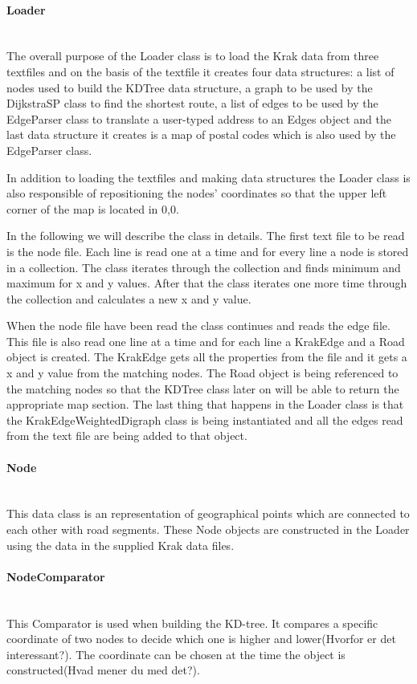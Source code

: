 \documentclass[a4paper,10pt,titlepage]{article}
\begin{document}
				
				\paragraph{Loader}\mbox{}\\
The overall purpose of the Loader class is to load the Krak data from three textfiles and on the basis of the textfile it creates four data structures: a list of nodes used to build the KDTree data structure, a graph to be used by the DijkstraSP class to find the shortest route, a list of edges to be used by the EdgeParser class to translate a user-typed address to an Edges object and the last data structure it creates is a map of postal codes which is also used by the EdgeParser class.

In addition to loading the textfiles and making data structures the Loader class is also responsible of repositioning the nodes' coordinates so that the upper left corner of the map is located in 0,0.

In the following we will describe the class in details. The first text file to be read is the node file. Each line is read one at a time and for every line a node is stored in a collection. The class iterates through the collection and finds minimum and maximum for x and y values. After that the class iterates one more time through the collection and calculates a new x and y value.  

When the node file have been read the class continues and reads the edge file. This file is also read one line at a time and for each line a KrakEdge and a Road object is created. The KrakEdge gets all the properties from the file and it gets a x and y value from the matching nodes. The Road object is being referenced to the matching nodes so that the KDTree class later on will be able to return the appropriate map section. The last thing that happens in the Loader class is that the KrakEdgeWeightedDigraph class is being instantiated and all the edges read from the text file are being added to that object. 

				\paragraph{Node}\mbox{}\\				
				This data class is an representation of geographical points which are connected to each other with road segments. These Node objects are constructed in the Loader using the data in the supplied Krak data files. 
				
				\paragraph{NodeComparator}\mbox{}\\				
This Comparator is used when building the KD-tree. It compares a specific coordinate of two nodes to decide which one is higher and lower(Hvorfor er det interessant?). The coordinate can be chosen at the time the object is constructed(Hvad mener du med det?).
\end{document}
